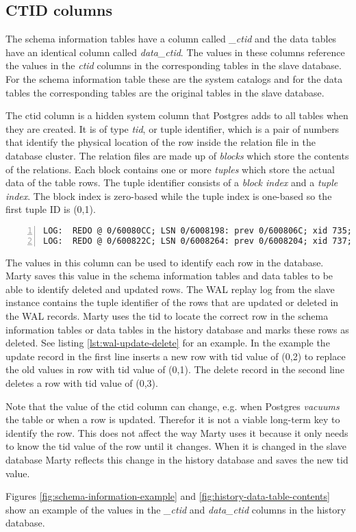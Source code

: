 \subsection{CTID columns}
\label{ch:implementation-history-ctid}
The schema information tables have a column called \textit{\_ctid} and the data tables have an identical column called \textit{data\_ctid}.
The values in these columns reference the values in the \textit{ctid} columns in the corresponding tables in the slave database.
For the schema information table these are the system catalogs and for the data tables the corresponding tables are the original tables in the slave database.

The ctid column is a hidden system column that Postgres adds to all tables when they are created.
It is of type \textit{tid}, or tuple identifier, which is a pair of numbers that identify the physical location of the row inside the relation file in the database cluster.
The relation files are made up of \textit{blocks} which store the contents of the relations.
Each block contains one or more \textit{tuples} which store the actual data of the table rows.
The tuple identifier consists of a \textit{block index} and a \textit{tuple index}.
The block index is zero-based while the tuple index is one-based so the first tuple ID is (0,1).

\begin{lstlisting}[caption={WAL update and delete example},label={lst:wal-update-delete},numbers=left,xleftmargin=2em]
LOG:  REDO @ 0/60080CC; LSN 0/6008198: prev 0/600806C; xid 735; len 37; bkpb0: Heap - update: rel 1663/16384/16385; tid 0/1 xmax 735 ; new tid 0/2 xmax 0
LOG:  REDO @ 0/600822C; LSN 0/6008264: prev 0/6008204; xid 737; len 26: Heap - delete: rel 1663/16384/16385; tid 0/3 KEYS_UPDATED
\end{lstlisting}

The values in this column can be used to identify each row in the database.
Marty saves this value in the schema information tables and data tables to be able to identify deleted and updated rows.
The WAL replay log from the slave instance contains the tuple identifier of the rows that are updated or deleted in the WAL records.
Marty uses the tid to locate the correct row in the schema information tables or data tables in the history database and marks these rows as deleted.
See listing \ref{lst:wal-update-delete} for an example.
In the example the update record in the first line inserts a new row with tid value of (0,2) to replace the old values in row with tid value of (0,1).
The delete record in the second line deletes a row with tid value of (0,3).

Note that the value of the ctid column can change, e.g. when Postgres \textit{vacuums} the table or when a row is updated.
Therefor it is not a viable long-term key to identify the row.
This does not affect the way Marty uses it because it only needs to know the tid value of the row until it changes.
When it is changed in the slave database Marty reflects this change in the history database and saves the new tid value.

Figures \ref{fig:schema-information-example} and \ref{fig:history-data-table-contents} show an example of the values in the \textit{\_ctid} and \textit{data\_ctid} columns in the history database.